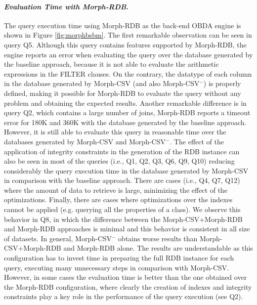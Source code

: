\noindent\paragraph*{\textit{Evaluation Time with Morph-RDB}.} The query execution time using Morph-RDB as the back-end OBDA engine is shown in Figure \ref{fig:morphbsbm}. The first remarkable observation can be seen in query Q5. Although this query contains features supported by Morph-RDB, the engine reports an error when evaluating the query over the database generated by the baseline approach, because it is not able to evaluate the arithmetic expressions in the FILTER clauses. On the contrary, the datatype of each column in the database generated by Morph-CSV (and also Morph-CSV$^-$) is properly defined, making it possible for Morph-RDB to evaluate the query without any problem and obtaining the expected results. Another remarkable difference is in query Q2, which contains a large number of joins, Morph-RDB reports a timeout error for 180K and 360K with the database generated by the baseline approach. However, it is still able to evaluate this query in reasonable time over the databases generated by Morph-CSV and Morph-CSV$^-$. The effect of the application of integrity constraints in the generation of the RDB instance can also be seen in most of the queries (i.e., Q1, Q2, Q3, Q6, Q9, Q10) reducing considerably the query execution time in the database generated by Morph-CSV in comparison with the baseline approach. There are cases (i.e., Q4, Q7, Q12) where the amount of data to retrieve is large, minimizing the effect of the optimizations. Finally, there are cases where optimizations over the indexes cannot be applied (e.g. querying all the properties of a class). We observe this behavior in Q8, in which the difference between the Morph-CSV+Morph-RDB and Morph-RDB approaches is minimal and this behavior is consistent in all size of datasets. In general, Morph-CSV$^-$ obtains worse results than Morph-CSV+Morph-RDB and Morph-RDB alone. The results are understandable as this configuration has to invest time in preparing the full RDB instance for each query, executing many unnecessary steps in comparison with Morph-CSV. However, in some cases the evaluation time is better than the one obtained over the Morph-RDB configuration, where clearly the creation of indexes and integrity constraints play a key role in the performance of the query execution (see Q2).

